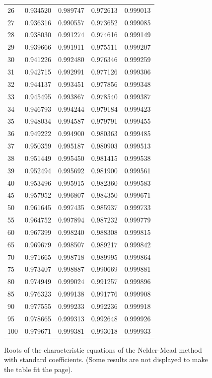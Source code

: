 \begin{figure}[htbp]
\begin{center}
\begin{tiny}
\begin{tabular}{|l|l|l|l|l|}
26 & 0.934520 & 0.989747 & 0.972613 & 0.999013\\
27 & 0.936316 & 0.990557 & 0.973652 & 0.999085\\
28 & 0.938030 & 0.991274 & 0.974616 & 0.999149\\
29 & 0.939666 & 0.991911 & 0.975511 & 0.999207\\
30 & 0.941226 & 0.992480 & 0.976346 & 0.999259\\
31 & 0.942715 & 0.992991 & 0.977126 & 0.999306\\
32 & 0.944137 & 0.993451 & 0.977856 & 0.999348\\
33 & 0.945495 & 0.993867 & 0.978540 & 0.999387\\
34 & 0.946793 & 0.994244 & 0.979184 & 0.999423\\
35 & 0.948034 & 0.994587 & 0.979791 & 0.999455\\
36 & 0.949222 & 0.994900 & 0.980363 & 0.999485\\
37 & 0.950359 & 0.995187 & 0.980903 & 0.999513\\
38 & 0.951449 & 0.995450 & 0.981415 & 0.999538\\
39 & 0.952494 & 0.995692 & 0.981900 & 0.999561\\
40 & 0.953496 & 0.995915 & 0.982360 & 0.999583\\
45 & 0.957952 & 0.996807 & 0.984350 & 0.999671\\
50 & 0.961645 & 0.997435 & 0.985937 & 0.999733\\
55 & 0.964752 & 0.997894 & 0.987232 & 0.999779\\
60 & 0.967399 & 0.998240 & 0.988308 & 0.999815\\
65 & 0.969679 & 0.998507 & 0.989217 & 0.999842\\
70 & 0.971665 & 0.998718 & 0.989995 & 0.999864\\
75 & 0.973407 & 0.998887 & 0.990669 & 0.999881\\
80 & 0.974949 & 0.999024 & 0.991257 & 0.999896\\
85 & 0.976323 & 0.999138 & 0.991776 & 0.999908\\
90 & 0.977555 & 0.999233 & 0.992236 & 0.999918\\
95 & 0.978665 & 0.999313 & 0.992648 & 0.999926\\
100 & 0.979671 & 0.999381 & 0.993018 & 0.999933\\
\hline
\end{tabular}
\end{tiny}
\end{center}
\caption{Roots of the characteristic equations of the Nelder-Mead method with standard 
coefficients. (Some results are not displayed to make the table fit the page).}
\label{table-nm-roots-table}
\end{figure}

